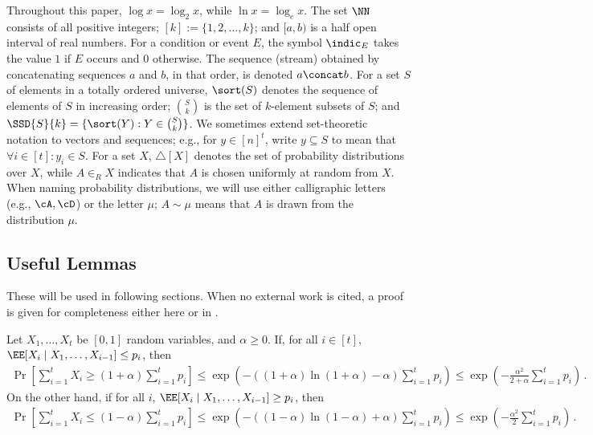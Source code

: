 \begin{itemize}
\begin{itemize}
 Throughout this paper, $\log x = \log_2 x$, while $\ln x =
\log_e x$. The set $\NN$ consists of all positive integers; $[k] :=
\{1,2,\ldots,k\}$; and $[a,b)$ is a half open interval of real numbers. For a
condition or event $E$, the symbol $\indic_{E}$ takes the value $1$ if $E$
occurs and $0$ otherwise. The sequence (stream) obtained by concatenating
sequences $a$ and $b$, in that order, is denoted $a \concat b$. For a set $S$
of elements in a totally ordered universe, $\sort(S)$ denotes the sequence of
elements of $S$ in increasing order; $\binom{S}{k}$ is the set of $k$-element
subsets of $S$; and $\SSD{S}{k} = \{\sort(Y) : Y \in \binom{S}{k}\}$. We
sometimes extend set-theoretic notation to vectors and sequences; e.g., for $y
\in [n]^t$, write $y \subseteq S$ to mean that $\forall i \in [t]: y_i \in S$.
For a set $X$, $\triangle[X]$ denotes the set of probability distributions
over $X$, while $A \in_R X$ indicates that $A$ is chosen uniformly at random
from $X$. When naming probability distributions, we will use either
calligraphic letters (e.g., $\cA,\cD$) or the letter $\mu$; $A \sim \mu$ means
that $A$ is drawn from the distribution $\mu$.

\subsection{Useful Lemmas}\label{subsec:useful-lemmas}

These will be used in following sections. When no external work is cited, a proof is given for completeness either here or in .

\begin{lemma}\label{lem:azumanoff}
  Let $X_1,\ldots,X_t$ be $[0,1]$ random variables, and $\alpha \ge 0$. If, for all $i \in [t]$, $\EE[X_i \mid X_1,\ldots,X_{i-1}] \le p_i$, then
  \begin{align*}
    \Pr\left[ \sum_{i=1}^{t} X_i \ge (1 + \alpha) \sum_{i =1}^{t} p_i \right] 
    \le \exp\left( - ((1+\alpha) \ln (1+\alpha) - \alpha) \sum_{i =1}^{t} p_i\right) 
    \le \exp\left( - \frac{\alpha^2}{2 + \alpha} \sum_{i =1}^{t} p_i\right) \,.
  \end{align*}
  On the other hand, if for all $i$, $\EE[X_i \mid X_1,\ldots,X_{i-1}] \ge p_i$, then
  \begin{align*}
    \Pr\left[ \sum_{i=1}^{t} X_i \le (1 - \alpha) \sum_{i =1}^{t} p_i \right]
    \le \exp\left( - ((1-\alpha) \ln (1-\alpha) + \alpha) \sum_{i =1}^{t} p_i\right) 
    \le \exp\left( - \frac{\alpha^2}{2} \sum_{i =1}^{t} p_i\right) \,.
  \end{align*}
\end{lemma}


\end{itemize}
\end{itemize}

